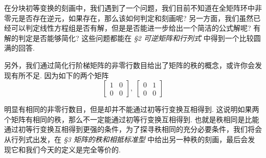 \documentclass[10pt,openany]{article}
\theoremstyle{thmstyle} %
\theoremstyle{defstyle} %
\theoremstyle{prostyle} %
\theoremstyle{exastyle}
\theoremstyle{remstyle}
\begin{document}
在分块初等变换的刻画中，我们遇到了一个问题，我们目前不知道在全矩阵环中非零元是否存在逆元，如果存在，那么该如何判定和刻画呢? 另一方面，我们虽然已经可以判定线性方程组是否有解，但是是否能进一步给出一个简洁的公式解呢? 有解的判定是否能够简化? 这些问题都能在 \textit{\S 2 可逆矩阵和行列式} 中得到一个比较圆满的回答. 

另外，我们通过简化行阶梯矩阵的非零行数目给出了矩阵的秩的概念，或许你会发现有所不足. 因为如下的两个矩阵
\[ \begin{bmatrix}
	1 & 0 \\ 0 & 0
\end{bmatrix}, \; \begin{bmatrix}
0 & 1 \\ 0 & 0
\end{bmatrix} \]

明显有相同的非零行数目，但是却并不能通过初等行变换互相得到. 这说明如果两个矩阵有相同的秩，那么不一定能通过初等行变换互相得到. 也就是秩相同是比能通过初等行变换互相得到更强的条件，为了探寻秩相同的充分必要条件，我们将会从行列式出发，在 \textit{\S 3 矩阵的秩和相抵标准型} 中给出另一种秩的刻画，最后会发现它和我们今天的定义是完全等价的. 
\end{document}
